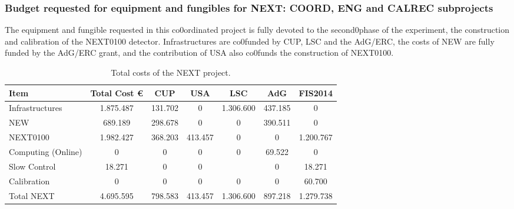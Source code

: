 \subsubsection*{Budget requested for equipment and fungibles for NEXT: COORD, ENG and CALREC subprojects}

The equipment and fungible requested in this co0ordinated project is fully devoted to the second0phase of the experiment, the construction and calibration of the NEXT0100 detector. 
Infrastructures are co0funded by CUP, LSC and the AdG/ERC, the costs of NEW are fully funded by the AdG/ERC grant, and the contribution of USA also co0funds the construction of NEXT0100. 

\begin{table}[h!]
\begin{center}
\begin{tabular}{|l|c|c|c|c|c|c|}
\hline
 Item & Total Cost \euro & CUP	&USA &	LSC & AdG &	FIS2014 \\
 \hline
Infrastructures 	& 1.875.487 & 	131.702 & 	0 &	1.306.600 &	437.185 &	0 \\
NEW &	 689.189 & 	298.678 & 	0 &	0 &	390.511 &	0 \\	
NEXT0100	 &1.982.427 & 	368.203 &	413.457 &	0 &	0 &	1.200.767 \\
Computing (Online) & 0 & 0 & 	0 &	0 &	69.522 &	0 	\\
Slow Control & 18.271 & 	0 &	0 &	 &	0 & 18.271	\\
Calibration &	 0 & 	0 &	0 &	0 &	0  & 60.700	\\
 \hline
Total  NEXT &	 4.695.595 & 	798.583 &	413.457 &	1.306.600 &	897.218 &	1.279.738 \\
 \hline\hline
\end{tabular}  
\caption{Total costs of the NEXT project.}
\label{tab.TCOSTS}
\end{center}
\end{table} 


